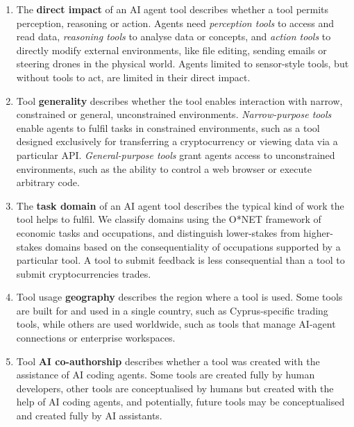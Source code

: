 \documentclass[manuscript,screen,nonacm,oneside]{acmart}
\begin{document}
\begin{enumerate}
\def\labelenumi{\arabic{enumi}.}
\item
  The \textbf{direct impact} of an AI agent tool describes whether a tool permits perception, reasoning or action. Agents need \emph{perception tools} to access and read data, \emph{reasoning tools} to analyse data or concepts, and \emph{action tools} to directly modify external environments, like file editing, sending emails or steering drones in the physical world. Agents limited to sensor-style tools, but without tools to act, are limited in their direct impact.

\item 
  Tool \textbf{generality} describes whether the tool enables interaction with narrow, constrained or general, unconstrained environments. \emph{Narrow-purpose tools} enable agents to fulfil tasks in constrained environments, such as a tool designed exclusively for transferring a cryptocurrency or viewing data via a particular API. \emph{General-purpose tools} grant agents access to unconstrained environments, such as the ability to control a web browser or execute arbitrary code. 

\item 
  The \textbf{task domain} of an AI agent tool describes the typical kind of work the tool helps to fulfil. We classify domains using the O*NET framework of economic tasks and occupations, and distinguish lower-stakes from higher-stakes domains based on the consequentiality of occupations supported by a particular tool. A tool to submit feedback is less consequential than a tool to submit cryptocurrencies trades. 

\item 
  Tool usage \textbf{geography} describes the region where a tool is used. Some tools are built for and used in a single country, such as Cyprus-specific trading tools, while others are used worldwide, such as tools that manage AI-agent connections or enterprise workspaces.

\item
  Tool \textbf{AI co-authorship} describes whether a tool was created with the assistance of AI coding agents. Some tools are created fully by human developers, other tools are conceptualised by humans but created with the help of AI coding agents, and potentially, future tools may be conceptualised and created fully by AI assistants.
\end{enumerate}
\end{document}
